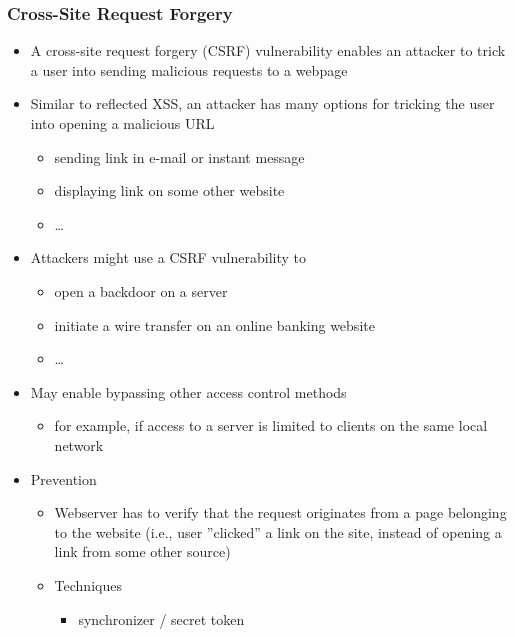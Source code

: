 \documentclass[final]{article}
\begin{document}
\subsubsection*{Cross-Site Request Forgery}
\begin{itemize}[nosep]
    \item A cross-site request forgery (CSRF) vulnerability enables an attacker to trick a user into sending malicious requests to a webpage
    \item Similar to reflected XSS, an attacker has many options for tricking the user into opening a malicious URL
          \begin{itemize}[nosep]
              \item sending link in e-mail or instant message
              \item displaying link on some other website
              \item \dots
          \end{itemize}
    \item Attackers might use a CSRF vulnerability to
          \begin{itemize}[nosep]
              \item open a backdoor on a server
              \item initiate a wire transfer on an online banking website
              \item \dots
          \end{itemize}
    \item May enable bypassing other access control methods
          \begin{itemize}[nosep]
              \item for example, if access to a server is limited to clients on the same local network
          \end{itemize}
    \item Prevention
          \begin{itemize}[nosep]
              \item Webserver has to verify that the request originates from a page belonging to the website (i.e., user ''clicked'' a link on the site, instead of opening a link from some other source)
              \item Techniques
                    \begin{itemize}[nosep]
                        \item synchronizer / secret token
                              \begin{itemize}[nosep]

\end{itemize}
\end{itemize}
\end{itemize}
\end{itemize}
\end{document}

